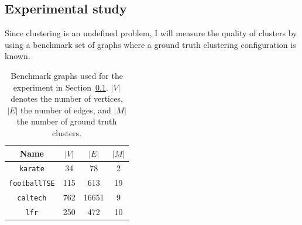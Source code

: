 \subsection{Experimental study}
\label{sec:clustering_experiment}
Since clustering is an undefined problem, I will measure the quality of clusters by using a benchmark set of graphs where a ground truth clustering configuration is known.

\begin{table}
    \centering
    \caption[Benchmark graphs used for the experiment in Section~\ref{sec:clustering_experiment}]{Benchmark graphs used for the experiment in Section~\ref{sec:clustering_experiment}. $|V|$ denotes the number of vertices, $|E|$ the number of edges, and $|M|$ the number of ground truth clusters.}
    \setlength{\tabcolsep}{1em} %
    {\renewcommand{\arraystretch}{1.25}%
    \begin{tabular}{|c|c|c|c|}
        \hline
        Name & $|V|$ & $|E|$ & $|M|$
        \\\hline\hline
        \texttt{karate} & 34 & 78 & 2
        \\\hline
        \texttt{footballTSE} & 115 & 613 & 19
        \\\hline
        \texttt{caltech} & 762 & 16651 & 9
        \\\hline
        \texttt{lfr} & 250 & 472 & 10
        \\\hline
    \end{tabular}}
    \label{tab:bundle_graphs}
\end{table}


